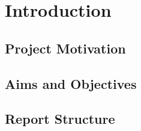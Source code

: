 \chapter{Introduction}
  \section{Project Motivation}
  \section{Aims and Objectives}
  \section{Report Structure}